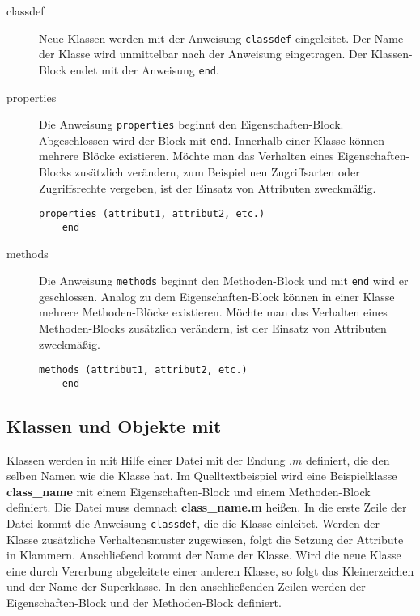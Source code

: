 \begin{description}

	\item[classdef] Neue Klassen werden mit der Anweisung
	\lstinline$classdef$ eingeleitet. Der Name der Klasse wird unmittelbar
	nach der Anweisung eingetragen. Der Klassen-Block endet mit der
	Anweisung \lstinline$end$.
	\item[properties] Die Anweisung \lstinline$properties$ beginnt den
	Eigenschaften-Block. Abgeschlossen wird der Block mit \lstinline$end$.
	Innerhalb einer Klasse k\"onnen mehrere Bl\"ocke existieren. M\"ochte
	man das Verhalten eines Eigenschaften-Blocks zus\"atzlich ver\"andern,
	zum Beispiel neu Zugriffsarten oder Zugriffsrechte vergeben, ist der
	Einsatz von Attributen zweckm\"a\ss ig.
	\begin{lstlisting}[frame=none]
	properties (attribut1, attribut2, etc.)
	end
	\end{lstlisting}
	\item[methods] Die Anweisung \lstinline$methods$ beginnt den
	Methoden-Block und mit \lstinline$end$ wird er geschlossen. Analog zu
	dem Eigenschaften-Block k\"onnen in einer Klasse mehrere
	Methoden-Bl\"ocke existieren. M\"ochte man das Verhalten eines
	Methoden-Blocks zus\"atzlich ver\"andern, ist der Einsatz von Attributen
	zweckm\"a\ss ig.
	\begin{lstlisting}[frame=none]
	methods (attribut1, attribut2, etc.)
	end
	\end{lstlisting}


\end{description}


\subsection*{Klassen und Objekte mit \matlab}

Klassen werden in \matlab mit Hilfe einer Datei mit der Endung $.m$ definiert,
die den selben Namen wie die Klasse hat. Im Quelltextbeispiel
 wird eine Beispielklasse \textbf{class\_name} mit
einem Eigenschaften-Block und einem Methoden-Block definiert. Die Datei muss
demnach \textbf{class\_name.m} hei\ss en. In die erste Zeile der Datei kommt die
Anweisung \lstinline$classdef$, die die Klasse einleitet. Werden der Klasse
zus\"atzliche Verhaltensmuster zugewiesen, folgt die Setzung der Attribute in
Klammern. Anschlie\ss end kommt der Name der Klasse. Wird die neue Klasse eine
durch Vererbung abgeleitete einer anderen Klasse, so folgt das Kleinerzeichen
und der Name der Superklasse. In den anschlie\ss enden Zeilen werden der
Eigenschaften-Block und der Methoden-Block definiert.


